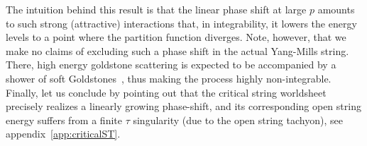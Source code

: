 \documentclass[
 reprint,
 amsmath,
 pre,
 amssymb,
 nofootinbib,
 aps,
 longbibliography,
]{revtex4-1}
\newcommand{\<}{{\langle}}
\renewcommand{\>}{{\rangle}}
\begin{document}
The intuition behind this result is that the linear phase shift at large $p$ amounts to such strong (attractive) interactions that, in integrability, it lowers the energy levels to a point where the partition function diverges. Note, however, that we make no claims of excluding such a phase shift
in the actual Yang-Mills string. There, high energy goldstone scattering is expected to be accompanied by a shower of soft Goldstones~\cite{Dubovsky_2018}, thus making the process highly non-integrable. Finally, let us conclude by pointing out that the critical string worldsheet precisely realizes a linearly growing phase-shift, and its corresponding open string energy suffers from a finite $\tau$ singularity (due to the open string tachyon), see appendix~\ref{app:criticalST}.
\end{document}
